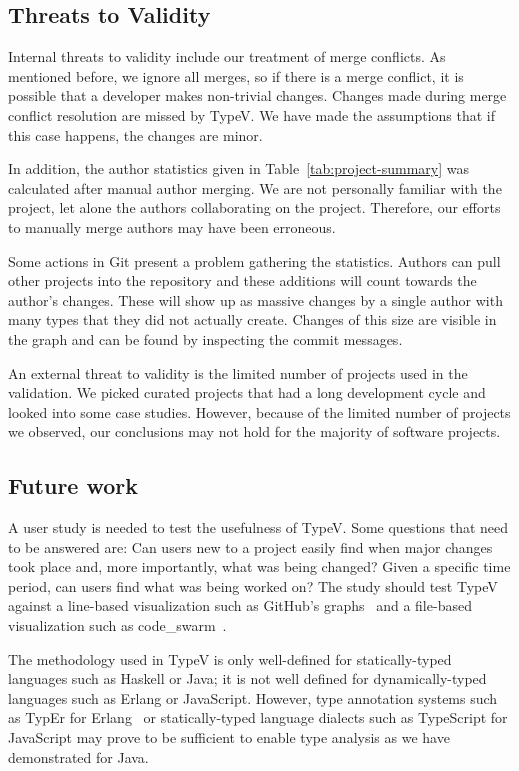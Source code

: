\subsection{Threats to Validity}

Internal threats to validity include our treatment of merge conflicts. As mentioned before, we ignore all merges, so if there is a merge conflict, it is possible that a developer makes non-trivial changes. Changes made during merge conflict resolution are missed by TypeV. We have made the assumptions that if this case happens, the changes are minor.

In addition, the author statistics given in Table~\ref{tab:project-summary} was calculated after manual author merging. We are not personally familiar with the project, let alone the authors collaborating on the project. Therefore, our efforts to manually merge authors may have been erroneous.

Some actions in Git present a problem gathering the statistics. Authors can pull other projects into the repository and these additions will count towards the author's changes. These will show up as massive changes by a single author with many types that they did not actually create. Changes of this size are visible in the graph and can be found by inspecting the commit messages.

An external threat to validity is the limited number of projects used in the validation. We picked curated projects that had a long development cycle and looked into some case studies. However, because of the limited number of projects we observed, our conclusions may not hold for the majority of software projects.

\subsection{Future work}

A user study is needed to test the usefulness of TypeV. Some questions that need to be answered are: Can users new to a project easily find when major changes took place and, more importantly, what was being changed? Given a specific time period, can users find what was being worked on? The study should test TypeV against a line-based visualization such as GitHub’s graphs~\cite{github-graphs} and a file-based visualization such as code\_swarm~\cite{codeswarm}.

The methodology used in TypeV is only well-defined for statically-typed languages such as Haskell or Java; it is not well defined for dynamically-typed languages such as Erlang or JavaScript. However, type annotation systems such as TypEr for Erlang~\cite{typer} or statically-typed language dialects such as TypeScript for JavaScript may prove to be sufficient to enable type analysis as we have demonstrated for Java.

